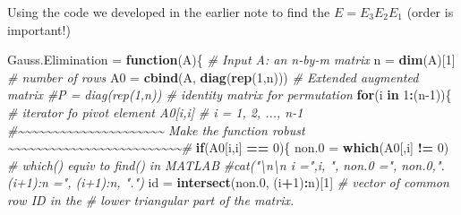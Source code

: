 \documentclass[
]{book}
\newenvironment{Shaded}{\begin{snugshade}}{\end{snugshade}}
\newcommand{\CommentTok}[1]{\textcolor[rgb]{0.56,0.35,0.01}{\textit{#1}}}
\newcommand{\ControlFlowTok}[1]{\textcolor[rgb]{0.13,0.29,0.53}{\textbf{#1}}}
\newcommand{\DecValTok}[1]{\textcolor[rgb]{0.00,0.00,0.81}{#1}}
\newcommand{\FloatTok}[1]{\textcolor[rgb]{0.00,0.00,0.81}{#1}}
\newcommand{\FunctionTok}[1]{\textcolor[rgb]{0.13,0.29,0.53}{\textbf{#1}}}
\newcommand{\NormalTok}[1]{#1}
\newcommand{\OtherTok}[1]{\textcolor[rgb]{0.56,0.35,0.01}{#1}}
\newcommand{\SpecialCharTok}[1]{\textcolor[rgb]{0.81,0.36,0.00}{\textbf{#1}}}
\begin{document}
Using the code we developed in the earlier note to find the \(E=E_3E_2E_1\) (order is important!)

\begin{Shaded}
\begin{Highlighting}[]
\NormalTok{Gauss.Elimination }\OtherTok{=} \ControlFlowTok{function}\NormalTok{(A)\{}
  \CommentTok{\# Input A: an n{-}by{-}m matrix }
\NormalTok{  n }\OtherTok{=} \FunctionTok{dim}\NormalTok{(A)[}\DecValTok{1}\NormalTok{]         }\CommentTok{\# number of rows}
\NormalTok{  A0 }\OtherTok{=} \FunctionTok{cbind}\NormalTok{(A, }\FunctionTok{diag}\NormalTok{(}\FunctionTok{rep}\NormalTok{(}\DecValTok{1}\NormalTok{,n)))   }\CommentTok{\# Extended augmented matrix}
  \CommentTok{\#P = diag(rep(1,n))     \# identity matrix for permutation}
  \ControlFlowTok{for}\NormalTok{(i }\ControlFlowTok{in} \DecValTok{1}\SpecialCharTok{:}\NormalTok{(n}\DecValTok{{-}1}\NormalTok{))\{     }\CommentTok{\# iterator fo pivot element A0[i,i]}
                         \CommentTok{\# i = 1, 2, ..., n{-}1}
      \CommentTok{\#\textasciitilde{}\textasciitilde{}\textasciitilde{}\textasciitilde{}\textasciitilde{}\textasciitilde{}\textasciitilde{}\textasciitilde{}\textasciitilde{}\textasciitilde{}\textasciitilde{}\textasciitilde{}\textasciitilde{}\textasciitilde{}\textasciitilde{}\textasciitilde{}\textasciitilde{}\textasciitilde{}\textasciitilde{}\textasciitilde{}\textasciitilde{}   Make the function robust  \textasciitilde{}\textasciitilde{}\textasciitilde{}\textasciitilde{}\textasciitilde{}\textasciitilde{}\textasciitilde{}\textasciitilde{}\textasciitilde{}\textasciitilde{}\textasciitilde{}\textasciitilde{}\textasciitilde{}\textasciitilde{}\textasciitilde{}\textasciitilde{}\textasciitilde{}\textasciitilde{}\textasciitilde{}\textasciitilde{}\textasciitilde{}\textasciitilde{}\textasciitilde{}\textasciitilde{}\textasciitilde{}\#}
      \ControlFlowTok{if}\NormalTok{(A0[i,i] }\SpecialCharTok{==} \DecValTok{0}\NormalTok{)\{}
\NormalTok{          non}\FloatTok{.0} \OtherTok{=} \FunctionTok{which}\NormalTok{(A0[,i] }\SpecialCharTok{!=} \DecValTok{0}\NormalTok{)     }\CommentTok{\# which() equiv to find() in MATLAB}
              \CommentTok{\#cat("\textbackslash{}n\textbackslash{}n i =",i, ", non.0 =", non.0,". (i+1):n =", (i+1):n, ".")}
\NormalTok{              id }\OtherTok{=} \FunctionTok{intersect}\NormalTok{(non}\FloatTok{.0}\NormalTok{, (i}\SpecialCharTok{+}\DecValTok{1}\NormalTok{)}\SpecialCharTok{:}\NormalTok{n)[}\DecValTok{1}\NormalTok{] }\CommentTok{\# vector of common row ID in the}
                                                \CommentTok{\# lower triangular part of the matrix.}

\end{Highlighting}
\end{Shaded}
\end{document}
